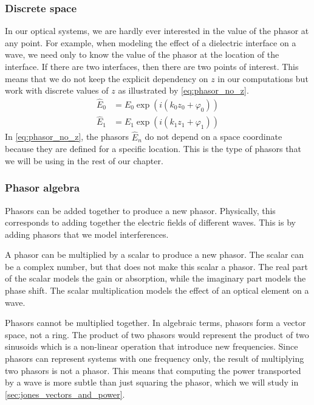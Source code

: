 \subsubsection{Discrete space}
In our optical systems, we are hardly ever interested in the value of the phasor at any point.
For example, when modeling the effect of a dielectric interface on a wave, we need only to know the value of the phasor at the location of the interface.
If there are two interfaces, then there are two points of interest.
This means that we do not keep the explicit dependency on $z$ in our computations but work with discrete values of $z$ as illustrated by \cref{eq:phasor_no_z}.
\begin{equation}
    \begin{aligned}
        \hat{E}_0 &= E_0 \exp(i(k_0 z_0 + \varphi_0))
        \\
        \hat{E}_1 &= E_1 \exp(i(k_1 z_1 + \varphi_1))
    \end{aligned}
    \label{eq:phasor_no_z}
\end{equation}
In \cref{eq:phasor_no_z}, the phasors $\hat{E}_n$ do not depend on a space coordinate because they are defined for a specific location.
This is the type of phasors that we will be using in the rest of our chapter.

\subsubsection{Phasor algebra}
Phasors can be added together to produce a new phasor.
Physically, this corresponds to adding together the electric fields of different waves.
This is by adding phasors that we model interferences.

A phasor can be multiplied by a scalar to produce a new phasor.
The scalar can be a complex number, but that does not make this scalar a phasor. 
The real part of the scalar models the gain or absorption, while the imaginary part models the phase shift.
The scalar multiplication models the effect of an optical element on a wave.

Phasors cannot be multiplied together.
In algebraic terms, phasors form a vector space, not a ring.
The product of two phasors would represent the product of two sinusoids which is a non-linear operation that introduce new frequencies.
Since phasors can represent systems with one frequency only, the result of multiplying two phasors is not a phasor.
This means that computing the power transported by a wave is more subtle than just squaring the phasor, which we will study in \vref{sec:jones_vectors_and_power}.



